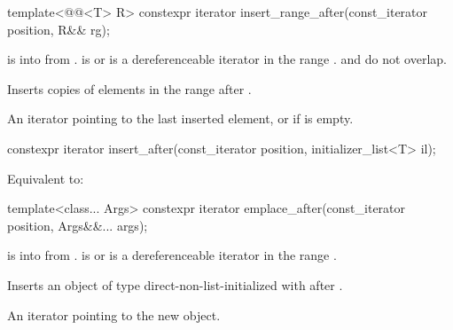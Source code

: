 %
\begin{itemdecl}
template<@@<T> R>
  constexpr iterator insert_range_after(const_iterator position, R&& rg);
\end{itemdecl}

\begin{itemdescr}
\pnum
\expects
{} is  into 
from .
 is  or
is a dereferenceable iterator in the range .
 and  do not overlap.

\pnum
\effects
Inserts copies of elements in the range  after .

\pnum
\returns
An iterator pointing to the last inserted element,
or  if  is empty.
\end{itemdescr}

%
\begin{itemdecl}
constexpr iterator insert_after(const_iterator position, initializer_list<T> il);
\end{itemdecl}

\begin{itemdescr}
\pnum
\effects
Equivalent to: 
\end{itemdescr}


%
\begin{itemdecl}
template<class... Args>
  constexpr iterator emplace_after(const_iterator position, Args&&... args);
\end{itemdecl}

\begin{itemdescr}
\pnum
\expects
{} is  into 
from .
 is  or is a dereferenceable
iterator in the range .

\pnum
\effects
Inserts an object of type  direct-non-list-initialized with
 after .

\pnum
\returns
An iterator pointing to the new object.
\end{itemdescr}

